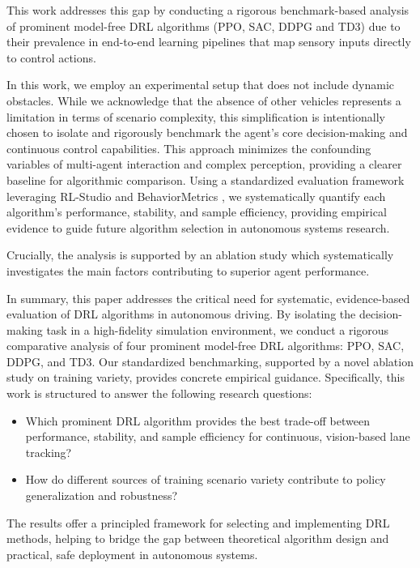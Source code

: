 \documentclass[]{interact}
\begin{document}
This work addresses this gap by conducting a rigorous benchmark-based analysis of prominent model-free DRL algorithms (PPO, SAC, DDPG and TD3) due to their prevalence in end-to-end learning pipelines that map sensory inputs directly to control actions.

In this work, we employ an experimental setup that does not include dynamic obstacles. While we acknowledge that the absence of other vehicles represents a limitation in terms of scenario complexity, this simplification is intentionally chosen to isolate and rigorously benchmark the agent's core decision-making and continuous control capabilities. This approach minimizes the confounding variables of multi-agent interaction and complex perception, providing a clearer baseline for algorithmic comparison.
Using a standardized evaluation framework leveraging RL-Studio and BehaviorMetrics \cite{paniego2024behaviormetrics}, we systematically quantify each algorithm's performance, stability, and sample efficiency, providing empirical evidence to guide future algorithm selection in autonomous systems research.

Crucially, the analysis is supported by an ablation study which systematically investigates the main factors contributing to superior agent performance.

In summary, this paper addresses the critical need for systematic, evidence-based evaluation of DRL algorithms in autonomous driving. By isolating the decision-making task in a high-fidelity simulation environment, we conduct a rigorous comparative analysis of four prominent model-free DRL algorithms: PPO, SAC, DDPG, and TD3. Our standardized benchmarking, supported by a novel ablation study on training variety, provides concrete empirical guidance. Specifically, this work is structured to answer the following research questions:
\begin{itemize}
    \item [RQ1] Which prominent DRL algorithm provides the best trade-off between performance, stability, and sample efficiency for continuous, vision-based lane tracking?
    \item [RQ2] How do different sources of training scenario variety contribute to policy generalization and robustness?
\end{itemize}
The results offer a principled framework for selecting and implementing DRL methods, helping to bridge the gap between theoretical algorithm design and practical, safe deployment in autonomous systems.
\end{document}
